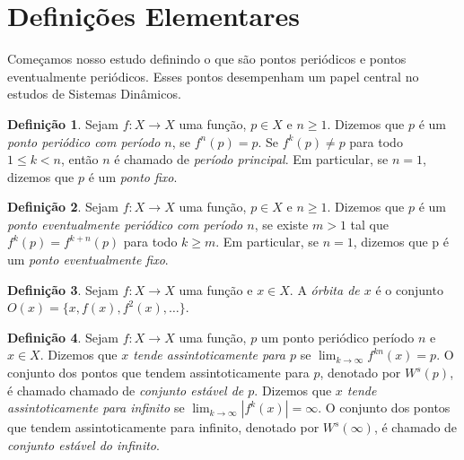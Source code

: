 \documentclass[a4paper, 12pt]{article}
\theoremstyle{definition}
\newtheorem{definition}{Definição}[section]
\theoremstyle{plain}
\theoremstyle{plain}
\theoremstyle{plain}
\theoremstyle{definition}
\theoremstyle{remark}
\newcommand{\RR}{\mathbb{R}}
\begin{document}
\section{Definições Elementares}

Começamos nosso estudo definindo o que são pontos periódicos e pontos eventualmente periódicos. Esses pontos desempenham um papel central no estudos de Sistemas Dinâmicos.
 
\begin{definition}
Sejam $f: X \to X$ uma função, $p \in X$ e $n \geq 1$.  Dizemos que $p$ é um \textit{ponto periódico com período $n$}, se $f^n(p) = p$. Se $f^k(p) \neq p$ para todo $1 \leq k < n$, então $n$ é chamado de \textit{período principal}. Em particular, se $n=1$, dizemos que $p$ é um \textit{ponto fixo}.%
\end{definition}

\begin{definition}
Sejam $f: X \to X$ uma função, $p \in X$ e $n \geq 1$. Dizemos que $p$ é um \textit{ponto eventualmente periódico com período $n$}, se existe $m > 1$ tal que $f^k(p) = f^{k+n}(p)$ para todo $k \geq m$. Em particular, se $n = 1$, dizemos que p é um \textit{ponto eventualmente fixo}.
\end{definition}

\begin{definition}
Sejam $f:X \to X$ uma função e $x \in X$. A \textit{órbita de $x$} é o conjunto $O(x) = \lbrace x, f(x), f^2(x), \dots \rbrace$.
\end{definition}

\begin{definition}
Sejam $f: X \to X$ uma função, $p$ um ponto periódico período $n$ e $x \in X$. Dizemos que \textit{$x$ tende assintoticamente para $p$} se $\lim_{k \to \infty} f^{kn}(x) = p$. O conjunto dos pontos que tendem assintoticamente para $p$, denotado por $W^s(p)$, é chamado chamado de \textit{conjunto estável de $p$}. Dizemos que \textit{$x$ tende assintoticamente para infinito} se $\lim_{k \to \infty} |f^{k}(x)| = \infty$. O conjunto dos pontos que tendem assintoticamente para infinito, denotado por $W^s(\infty)$, é chamado de \textit{conjunto estável do infinito}.
\end{definition}
\end{document}
